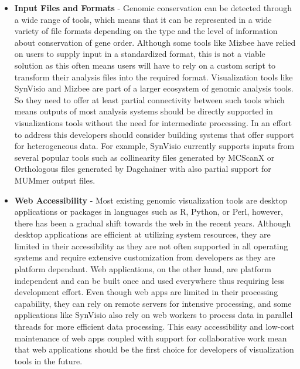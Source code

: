 \begin{itemize}
    \item \textbf{Input Files and Formats} - Genomic conservation can be detected through a wide range of tools, which means that it can be represented in a wide variety of file formats depending on the type and the level of information about conservation of gene order.
    Although some tools like Mizbee have relied on users to supply input in a standardized format, this is not a viable solution as this often means users will have to rely on a custom script to transform their analysis files into the required format. Visualization tools like SynVisio and Mizbee are part of a larger ecosystem of genomic analysis tools. So they need to offer at least partial connectivity between such tools which means outputs of most analysis systems should be directly supported in visualizations tools without the need for intermediate processing. In an effort to address this developers should consider building systems that offer support for heterogeneous data. For example, SynVisio currently supports inputs from several popular tools such as collinearity files generated by MCScanX or Orthologous files generated by Dagchainer with also partial support for MUMmer output files. 
 
    \item \textbf{Web Accessibility} - Most existing genomic visualization tools are desktop applications or packages in languages such as R, Python, or Perl, however, there has been a gradual shift towards the web in the recent years. Although desktop applications are efficient at utilizing system resources, they are limited in their accessibility as they are not often supported in all operating systems and require extensive customization from developers as they are platform dependant. Web applications, on the other hand, are platform independent and can be built once and used everywhere thus requiring less development effort. Even though web apps are limited in their processing capability, they can rely on remote servers for intensive processing, and some applications like SynVisio also rely on web workers to process data in parallel threads for more efficient data processing. This easy accessibility and low-cost maintenance of web apps coupled with support for collaborative work mean that web applications should be the first choice for developers of visualization tools in the future.
    

\end{itemize}

